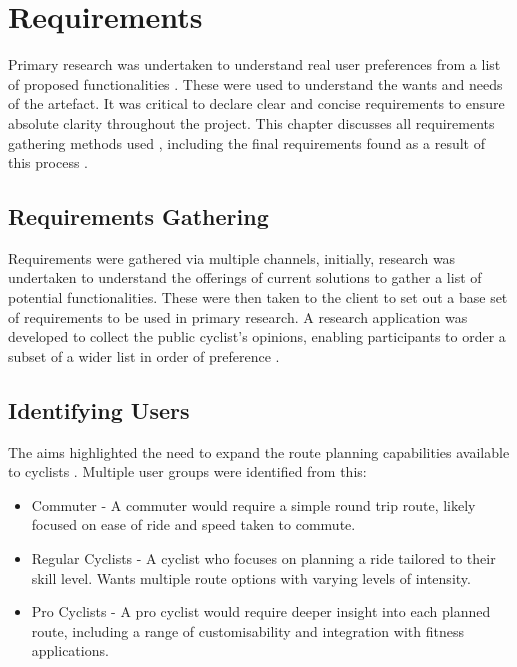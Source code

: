 \chapter{Requirements}
\label{chap:requirements}

Primary research was undertaken to understand real user preferences from a list of proposed functionalities . These were used to understand the wants and needs of the artefact. It was critical to declare clear and concise requirements to ensure absolute clarity throughout the project. This chapter discusses all requirements gathering methods used , including the final requirements found as a result of this process .

\section{Requirements Gathering}
\label{requirements:gathering}

Requirements were gathered via multiple channels, initially, research was undertaken to understand the offerings of current solutions to gather a list of potential functionalities. These were then taken to the client to set out a base set of requirements to be used in primary research. A research application was developed to collect the public cyclist's opinions, enabling participants to order a subset of a wider list in order of preference .

\section{Identifying Users}
\label{requirements:identifyingusers} 
The aims highlighted the need to expand the route planning capabilities available to cyclists . Multiple user groups were identified from this:
\begin{itemize}
  \item Commuter - A commuter would require a simple round trip route, likely focused on ease of ride and speed taken to commute.
  \item Regular Cyclists - A cyclist who focuses on planning a ride tailored to their skill level. Wants multiple route options with varying levels of intensity.
  \item Pro Cyclists - A pro cyclist would require deeper insight into each planned route, including a range of customisability and integration with fitness applications.
\end{itemize}


